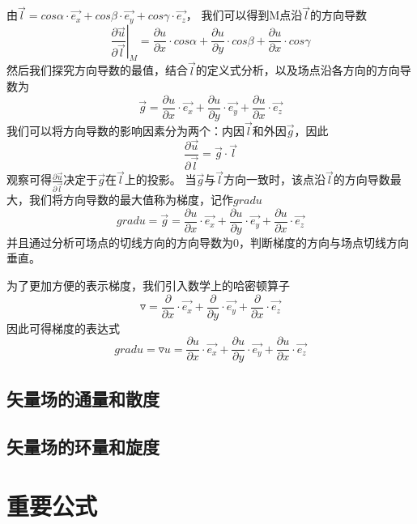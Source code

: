 \documentclass[UTF8]{article}
\begin{document}
由$\vec{l} = cos\alpha \cdot \vec{e_{x}}+cos\beta \cdot \vec{e_{y}}+cos\gamma \cdot \vec{e_{z}}$，
我们可以得到M点沿$\vec{l}$的方向导数
\begin{equation}
    \left. \frac{\partial \vec u}{\partial \vec l} \right|_{M} = 
    \frac{\partial u}{\partial x} \cdot cos\alpha+\frac{\partial u}{\partial y} \cdot cos\beta+\frac{\partial u}{\partial x} \cdot cos\gamma
\end{equation}
然后我们探究方向导数的最值，结合$\vec{l}$的定义式分析，以及场点沿各方向的方向导数为
\begin{equation}
    \vec{g} = 
    \frac{\partial u}{\partial x} \cdot \vec{e_{x}}+\frac{\partial u}{\partial y} \cdot  \vec{e_{y}}+\frac{\partial u}{\partial x} \cdot \vec{e_{z}}
\end{equation}
我们可以将方向导数的影响因素分为两个：内因$\vec{l}$和外因$\vec{g}$，因此
\begin{equation}
    \frac{\partial \vec u}{\partial \vec l} = \vec{g} \cdot \vec{l}
\end{equation}
观察可得$\frac{\partial \vec u}{\partial \vec l}$决定于$\vec{g}$在$\vec{l}$上的投影。
当$\vec{g}$与$\vec{l}$方向一致时，该点沿$\vec{l}$的方向导数最大，我们将方向导数的最大值称为{\heiti 梯度}，记作$grad u$
\begin{equation}
    grad u = \vec{g} = 
    \frac{\partial u}{\partial x} \cdot \vec{e_{x}}+\frac{\partial u}{\partial y} \cdot  \vec{e_{y}}+\frac{\partial u}{\partial x} \cdot \vec{e_{z}}
\end{equation}
并且通过分析可场点的切线方向的方向导数为0，判断{\heiti 梯度的方向与场点切线方向垂直}。

为了更加方便的表示梯度，我们引入数学上的哈密顿算子
\begin{equation}
    \triangledown = 
    \frac{\partial}{\partial x} \cdot \vec{e_{x}}+\frac{\partial}{\partial y} \cdot  \vec{e_{y}}+\frac{\partial}{\partial x} \cdot \vec{e_{z}}
\end{equation}
因此可得梯度的表达式
\begin{equation}
    grad u = \triangledown u =
    \frac{\partial u}{\partial x} \cdot \vec{e_{x}}+\frac{\partial u}{\partial y} \cdot  \vec{e_{y}}+\frac{\partial u}{\partial x} \cdot \vec{e_{z}}
\end{equation}

\subsection{矢量场的通量和散度}
\subsection{矢量场的环量和旋度}

\section{重要公式}
\end{document}
